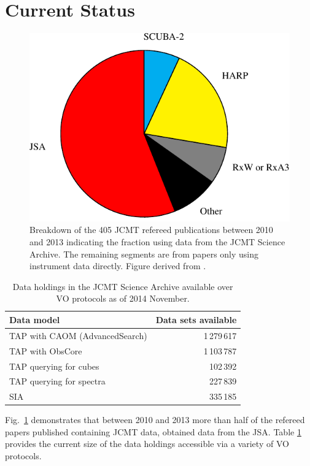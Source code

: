\documentclass[final,authoryear,5p,times,twocolumn]{elsarticle}
\newcommand*\figref[1]{Fig.~\ref{#1}}
\begin{document}
\section{Current Status}

\begin{figure}[t]
\includegraphics[width=\columnwidth]{jcmt-pubs-crop}
\caption{Breakdown of the 405 JCMT refereed publications between 2010 and
    2013 indicating the fraction using data from the JCMT Science
    Archive. The remaining segments are from papers only using instrument
    data directly. Figure derived from \citet{2014SPIE9152-93}.}
\label{fig:jsapubs}
\end{figure}

\begin{table}
\caption{Data holdings in the JCMT Science Archive available over VO
  protocols as of 2014 November.}
\label{tab:cadcvo}
\begin{center}
\begin{tabular}{|l|r|}
\hline
Data model & Data sets available\\ \hline
TAP with CAOM (AdvancedSearch) & 1\,279\,617 \\
TAP with ObsCore & 1\,103\,787\\
TAP querying for cubes & 102\,392\\
TAP querying for spectra & 227\,839\\
SIA  & 335\,185\\ \hline
\end{tabular}
\end{center}
\end{table}

\figref{fig:jsapubs} demonstrates that between 2010 and 2013 more
than half of the refereed papers published containing JCMT data,
obtained data from the JSA. Table \ref{tab:cadcvo} provides the
current size of the data holdings accessible via a variety of VO protocols.
\end{document}

